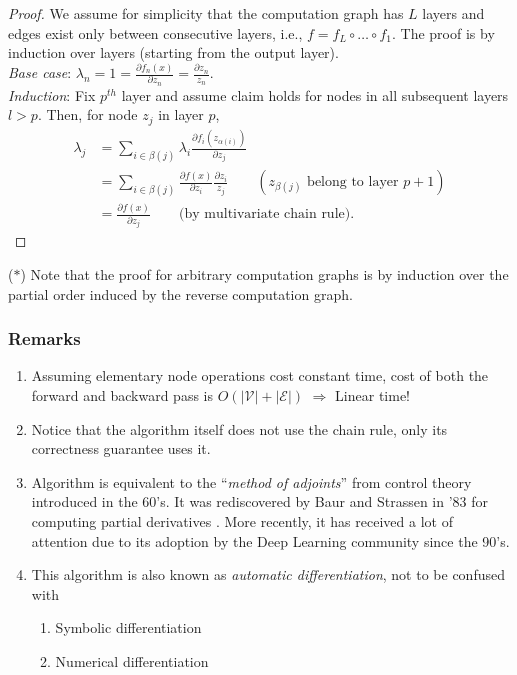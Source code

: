 \begin{proof}
We assume for simplicity that the computation graph has $L$ layers and edges exist only between consecutive layers, i.e., $f = f_L \circ \dots \circ f_1 $. The proof is by induction over layers (starting from the output layer). \\
\medskip
\textit{Base case}: $\lambda_n = 1 = \frac{\partial f_n (x)}{\partial z_n} = \frac{\partial z_n}{z_n}$. \\
\medskip
\textit{Induction}: Fix $p^{th}$ layer and assume claim holds for nodes in all subsequent layers $l > p$.  Then, for node $z_j$ in layer $p$, 
\begin{align*}
\lambda_j &= \sum_{i \in \beta(j)} \lambda_i \frac{\partial f_i(z_{\alpha (i)})}{\partial z_j} \\
&= \sum_{i \in \beta(j)} \frac{\partial f(x)}{\partial z_i} \frac{\partial z_i}{z_j} \qquad (z_{\beta (j)} \text{ belong to layer } p+1) \\
&= \frac{\partial f(x)}{\partial z_j} \qquad \text{(by multivariate chain rule)}.
\end{align*}
\end{proof}
\noindent ($\ast$) Note that the proof for arbitrary computation graphs is by induction over the partial order induced by the reverse computation graph. 
\subsubsection*{Remarks}
\begin{enumerate}
\item Assuming elementary node operations cost constant time, cost of both the forward and backward pass is $O(|\mathcal{V}| + |\mathcal{E}|)$ $\Rightarrow$ Linear time!
\item Notice that the algorithm itself does not use the chain rule, only its correctness guarantee uses it. 
\item Algorithm is equivalent to the ``\textit{method of adjoints}'' from control theory introduced in the 60's. It was rediscovered by Baur and Strassen in '83 for computing partial derivatives \cite{baur1983complexity}. More recently, it has received a lot of attention due to its adoption by the Deep Learning community since the 90's.
\item This algorithm is also known as \textit{automatic differentiation}, not to be confused with 
\begin{enumerate}
\item Symbolic differentiation
\item Numerical differentiation
\end{enumerate}
\end{enumerate}

